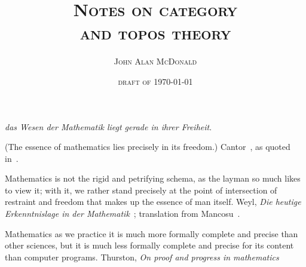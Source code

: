 \documentclass[11pt,openany]{book}
\title{\textsc{Notes on category \\ and topos theory}}
\author{\textsc{John Alan McDonald}}
\date{\textsc{draft of \today}}
\begin{document}
\maketitle
\setcounter{baseSectionLevel}{6}
\frontmatter
\pagestyle{front}
\begingroup
\let\onecolumn\twocolumn
\scshape
\tableofcontents
\upshape
\endgroup
\clearpage
\mainmatter
\pagestyle{plain}
\setcounter{currentlevel}{\value{baseSectionLevel}}
\label{sec:Preface}
\label{sec:2020-08}

\begin{boxquote}
\textsl{das Wesen der Mathematik liegt gerade in ihrer Freiheit}.
\par
(The essence of mathematics lies precisely in its freedom.)
\tcblower
{Cantor~\cite{Cantor:1883:ManifoldInfinity},
as quoted in~\cite{Ferreiros:2007:Labyrinth}.}
\end{boxquote}

\begin{boxquote}
Mathematics is not the rigid and petrifying schema, 
as the layman so much likes to view it; with it,
 we rather stand precisely at the point of intersection 
 of restraint and freedom that makes up the essence of man itself.
\tcblower
{Weyl, 
\emph{Die heutige Erkenntnislage in der Mathematik}~\cite{Weyl:1926:Heutige};
translation from Mancosu~\cite{Mancosu:1998:BrouwerHilbert}.}
\end{boxquote}

\begin{boxquote}
Mathematics as we practice it is much more formally 
complete and precise than
other sciences, but it is much less formally complete and precise 
for its content than computer programs.
\tcblower
{Thurston, 
\emph{On proof and progress in mathematics
}~\cite{Thurston:1994:Proof}}
\end{boxquote}
\end{document}
